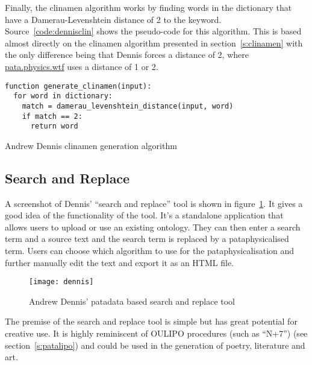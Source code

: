 Finally, the clinamen algorithm works by finding words in the dictionary that have a Damerau-Levenshtein distance of 2 to the keyword. Source~\ref{code:dennisclin} shows the pseudo-code for this algorithm. This is based almost directly on the clinamen algorithm presented in section~\ref{s:clinamen} with the only difference being that Dennis forces a distance of 2, where \url{pata.physics.wtf} uses a distance of 1 or 2.

\begin{listing}[!htbp] %
  \begin{verbatim}
function generate_clinamen(input):
  for word in dictionary:
    match = damerau_levenshtein_distance(input, word)
    if match == 2:
      return word
  \end{verbatim}
\caption[Dennis clinamen generation]{Andrew Dennis clinamen generation algorithm}
\label{code:dennisclin}
\end{listing}


\subsection{Search and Replace}

A screenshot of Dennis' ``search and replace'' tool \citeyear{Dennis2016} is shown in figure~\ref{img:dennis}. It gives a good idea of the functionality of the tool. It's a standalone application that allows users to upload or use an existing ontology. They can then enter a search term and a source text and the search term is replaced by a pataphysicalised term. Users can choose which algorithm to use for the pataphysicalisation and further manually edit the text and export it as an \ac{HTML} file.

\begin{figure}[!htbp]
  \centering
  \texttt{[image: dennis]}
\caption[Andrew Dennis' search and replace]{Andrew Dennis' patadata based search and replace tool}
\label{img:dennis}
\end{figure}

The premise of the search and replace tool is simple but has great potential for creative use. It is highly reminiscent of \ac{OULIPO} procedures (such as ``N+7'') (see section~\ref{s:patalipo}) and could be used in the generation of poetry, literature and art.

